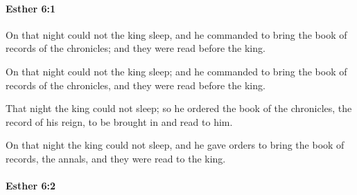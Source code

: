 		\paragraph{Esther 6:1} %
			\label{ESTHER-6-1}

			On that night could not the king sleep, and he commanded to bring the book of records of the chronicles; and they were read before the king.

			\begin{versebox}
					\item[BHS] 
					\item[LXX] 
					\item[ASV] On that night could not the king sleep; and he commanded to bring the book of records of the chronicles, and they were read before the king.
					\item[NIV] That night the king could not sleep; so he ordered the book of the chronicles, the record of his reign, to be brought in and read to him.
					\item[NRSV] On that night the king could not sleep, and he gave orders to bring the book of records, the annals, and they were read to the king.
			\end{versebox}

		\paragraph{Esther 6:2} %
			\label{ESTHER-6-2}

